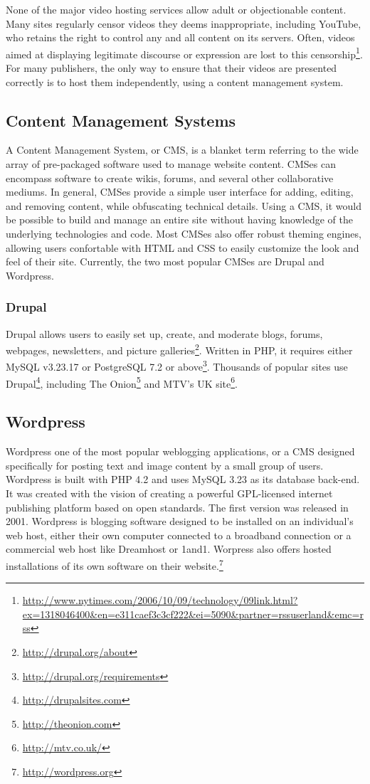 \documentclass[a4paper,12pt]{report}
\begin{document}
None of the major video hosting services allow adult or objectionable content.
Many sites regularly censor videos they deems inappropriate, including YouTube, who retains the right to control any and all content on its servers.
Often, videos aimed at displaying legitimate discourse or expression are lost to this censorship\footnote{\url{http://www.nytimes.com/2006/10/09/technology/09link.html?ex=1318046400&en=e311caef3c3cf222&ei=5090&partner=rssuserland&emc=rss}}.
For many publishers, the only way to ensure that their videos are presented correctly is to host them independently, using a content management system.

\subsection{Content Management Systems}

A Content Management System, or CMS, is a blanket term referring to the wide array of pre-packaged software used to manage website content. CMSes can encompass software to create wikis, forums, and several other collaborative mediums. In general, CMSes provide a simple user interface for adding, editing, and removing content, while obfuscating technical details. Using a CMS, it would be possible to build and manage an entire site without having knowledge of the underlying technologies and code. Most CMSes also offer robust theming engines, allowing users confortable with HTML and CSS to easily customize the look and feel of their site. Currently, the two most popular CMSes are Drupal and Wordpress.

\subsubsection{Drupal}
Drupal allows users to easily set up, create, and moderate blogs, forums, webpages, newsletters, and picture galleries\footnote{\url{http://drupal.org/about}}.
Written in PHP, it requires either MySQL v3.23.17 or PostgreSQL 7.2 or above\footnote{\url{http://drupal.org/requirements}}.
Thousands of popular sites use Drupal\footnote{\url{http://drupalsites.com}}, including The Onion\footnote{\url{http://theonion.com}} and MTV's UK site\footnote{\url{http://mtv.co.uk/}}.

\subsection{Wordpress}
Wordpress one of the most popular weblogging applications, or a CMS designed specifically for posting text and image content by a small group of users.
Wordpress is built with PHP 4.2 and uses MySQL 3.23 as its database back-end. 
It was created with the vision of creating a powerful GPL-licensed internet publishing platform based on open standards. 
The first version was released in 2001. 
Wordpress is blogging software designed to be installed on an individual's web host, either their own computer connected to a broadband connection or a commercial web host like Dreamhost or 1and1. Worpress also offers hosted installations of its own software on their website.\footnote{\url{http://wordpress.org}}
\end{document}

